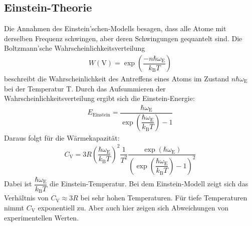 \subsection{Einstein-Theorie}
\label{sec:Einstein-Theorie}
Die Annahmen des Einstein’schen-Modells besagen, dass alle Atome mit derselben Frequenz schwingen, aber deren Schwingungen gequantelt sind. Die Boltzmann'sche Wahrscheinlichkeitsverteilung
\begin{align}
  \label{eqn:Boltzmann}
 W(\mathrm{V}) = \exp\left(\dfrac{-n \hbar\omega_\mathrm{E}}{k_\mathrm{B}T}\right)
\end{align}
beschreibt die Wahrscheinlichkeit des Antreffens eines Atoms im Zustand $n \hbar\omega_\mathrm{E}$ bei der Temperatur T. Durch das Aufsummieren der Wahrscheinlichkeitsverteilung ergibt sich die Einstein-Energie:
\begin{align}
  \label{eqn:Einstein-Energie}
 E_\mathrm{Einstein} = \dfrac{\hbar\omega_\mathrm{E}}{\exp\left(\dfrac{\hbar\omega_\mathrm{E}}{k_\mathrm{B}T}\right)-1}
\end{align}
Daraus folgt für die Wärmekapazität:
\begin{align}
  \label{eqn:Einstein Wärmekapazität}
 C_\mathrm{V} = 3R \left(\dfrac{\hbar\omega_\mathrm{E}}{k_\mathrm{B}T}\right)^2 \dfrac{1}{T^2} \dfrac{\exp\left(\hbar\omega_\mathrm{E}\right)}{(\exp\left(\dfrac{\hbar\omega_\mathrm{E}}{k_\mathrm{B}T}\right)-1)^2}
\end{align}
Dabei ist $\dfrac{\hbar\omega_\mathrm{E}}{k_\mathrm{B}T}$ die Einstein-Temperatur. Bei dem Einstein-Modell zeigt sich das Verhältnis von $ C_\mathrm{V} \approx 3R$ bei sehr hohen Temperaturen. Für tiefe Temperaturen nimmt  $C_\mathrm{V}$ exponentiell zu. Aber auch hier zeigen sich Abweichungen von experimentellen Werten.
